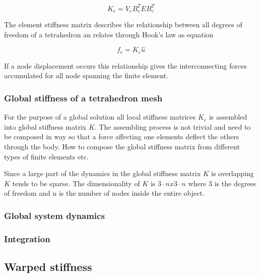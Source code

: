 \documentclass[10pt,a4paper]{article}
\begin{document}
\begin{equation}\label{eqn:stiffnessmatrix}
    K_{e} = V_{e} B_ {e}^{T}EB_ {e}^{T}
\end{equation}

The element stiffness matrix describes the relationship between all degrees of freedom of a tetrahedron an relates through Hook's law as equation

\begin{equation}\label{eqn:stiffnessmatrix}
    f_{e} = K_ {e}\hat{u}
\end{equation}

If a node displacement occurs this relationship gives the interconnecting forces accumulated for all node spanning the finite element.

\subsubsection{Global stiffness of a tetrahedron mesh}
For the purpose of a global solution all local stiffness matrices $K_{e}$ is assembled into global stiffness matrix $K$. The assembling process is not trivial and need to be composed in way so that a force affecting one elements deflect the others through the body. How to compose the global stiffness matrix from different types of finite elements etc.

 Since a large part of the dynamics in the global stiffness matrix $K$ is overlapping $K$ tends to be sparse. The dimensionality of $K$ is $3 \cdot n x 3 \cdot n$ where 3 is the degrees of freedom and n is the number of nodes inside the entire object.

\subsubsection{Global system dynamics}


\subsubsection{Integration}


\subsection{Warped stiffness}



\subsection{}
\end{document}
